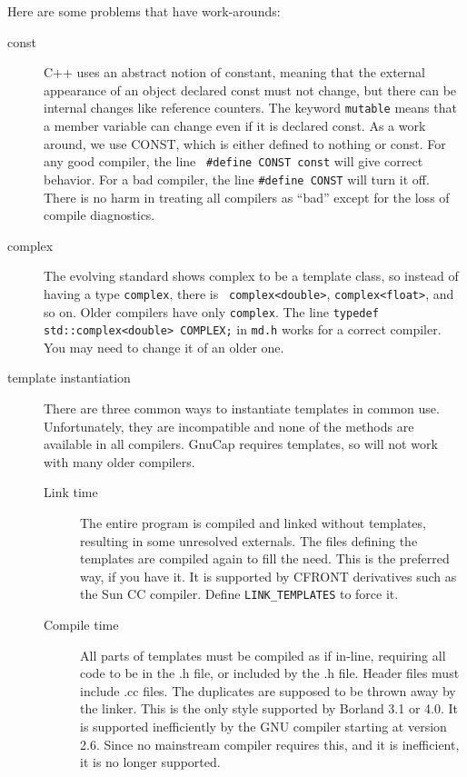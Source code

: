 Here are some problems that have work-arounds:

\begin{description}

\item[const] C++ uses an abstract notion of constant, meaning that
the external appearance of an object declared const must not change,
but there can be internal changes like reference counters.  The
keyword {\tt mutable} means that a member variable can change even if it
is declared const.  As a work around, we use CONST, which is either
defined to nothing or const.  For any good compiler, the line {\tt
\#define CONST const} will give correct behavior.  For a bad compiler,
the line {\tt \#define CONST} will turn it off.  There is no harm in
treating all compilers as ``bad'' except for the loss of compile
diagnostics.

\item[complex] The evolving standard shows complex to be a template
class, so instead of having a type {\tt complex}, there is {\tt
complex<double>}, {\tt complex<float>}, and so on.  Older compilers
have only {\tt complex}.  The line {\tt typedef std::complex<double>
COMPLEX;} in {\tt md.h} works for a correct compiler.  You may need to
change it of an older one.

\item[template instantiation] There are three common ways to
instantiate templates in common use.  Unfortunately, they are
incompatible and none of the methods are available in all compilers.
GnuCap requires templates, so will not work with many older compilers.

\begin{description}

\item[Link time] The entire program is compiled and linked without
templates, resulting in some unresolved externals.  The files
defining the templates are compiled again to fill the need.  This
is the preferred way, if you have it.  It is supported by CFRONT
derivatives such as the Sun CC compiler.  Define {\tt LINK\_TEMPLATES} to
force it. 

\item[Compile time] All parts of templates must be compiled as if
in-line, requiring all code to be in the .h file, or included by the
.h file.  Header files must include .cc files.  The duplicates are
supposed to be thrown away by the linker.  This is the only style
supported by Borland 3.1 or 4.0.  It is supported inefficiently by the
GNU compiler starting at version 2.6.  Since no mainstream compiler requires this, and it is inefficient, it is no longer supported.


\end{description}
\end{description}
